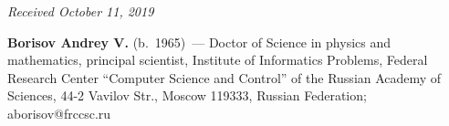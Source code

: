 
\vspace*{-3pt}

\hfill{\small\textit{Received October 11, 2019}}




\Contrl

\noindent
\textbf{Borisov Andrey V.} (b.\ 1965)~--- Doctor of Science in physics and 
mathematics, principal scientist, Institute of Informatics Problems, 
Federal Research Center ``Computer Science and Control'' of the Russian 
Academy of Sciences, 44-2 Vavilov Str., Moscow 119333, Russian 
Federation; \mbox{aborisov@frccsc.ru}

\label{end\stat}

\renewcommand{\bibname}{\protect\rm Литература} 